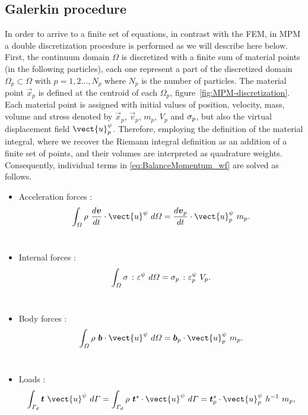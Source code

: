 \subsection{Galerkin procedure}
\label{sec:Galerkin-procedure}
In order to arrive to a finite set of equations, in contrast with the
FEM, in MPM a double discretization procedure is performed as we will
describe here below. First, the continuum domain
$\Omega$ is discretized with a finite sum of material points (in the
following particles), each one
represent a part of the discretized domain $\varOmega_p \subset
\varOmega$ with $p = 1,2\ldots ,N_p$ where $N_p$ is the number of
particles. The material point $\vec{x}_p$ is defined at the centroid
of each $\Omega_p$, figure~\ref{fig:MPM-discretization}.
Each material point is assigned with initial values of position,
velocity, mass, volume and stress denoted by $\vec{x}_p$,
$\vec{v}_p$, $m_p$,  $V_p$ and $\mathsf{\sigma}_p$, but also the
virtual displacement field $\vect{u}^{\psi}_{p}$. Therefore, employing
the definition of the material integral, where we recover the Riemann
integral definition as an addition of a finite set of points, and
their volumes are interpreted as quadrature weights. Consequently,
individual terms in \eqref{eq:BalanceMomentum_wf} are solved as follows. 
\begin{itemize}
\item Acceleration forces :
\begin{equation}
    \label{eq:particle_acceleration_forces}
    \Integral{3}{\rho\ \frac{d\vec{v}}{dt} \cdot \vect{u}^{\psi}} =
    \frac{d\vec{v}_{p}}{dt} \cdot \vect{u}^{\psi}_{p}\ m_p.
  \end{equation}\\
\item Internal forces :
  \begin{equation}
    \label{eq:particle_internal_forces}
    \Integral{3}{\tens{\sigma}\ \colon \tens{\varepsilon}^{\psi}} =
   \tens{\sigma}_{p}\ \colon \tens{\varepsilon}^{\psi}_p \ V_p.
  \end{equation}\\
\item Body forces :
\begin{equation}
  \label{eq:particle_body_forces}
  \Integral{3}{\rho\ \vec{b} \cdot \vect{u}^{\psi} } = 
  \vec{b}_{p} \cdot \vect{u}^{\psi}_p\ m_p.
\end{equation}\\
\item Loads :
\begin{equation}
  \begin{aligned}
    \label{eq:particle_load_forces}
    \Integral{2}{\vec{t}\ \vect{u}^{\psi}} = \Integral{2}{\rho\
      \vec{t}^s \cdot \vect{u}^{\psi}} = \vec{t}^s_{p} \cdot \vect{u}^{\psi}_{p}\ h^{-1}\ m_p ,
  \end{aligned} 
\end{equation}
\end{itemize}
